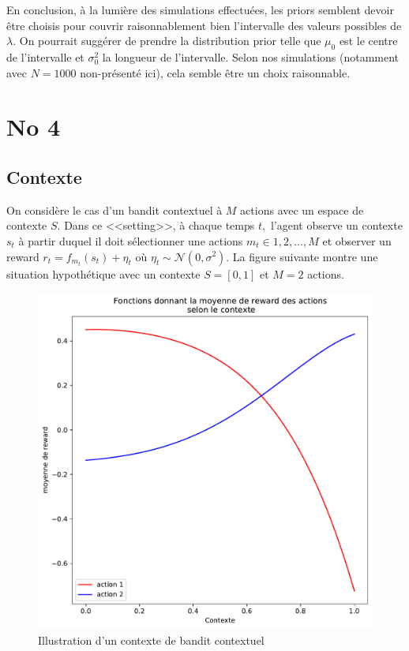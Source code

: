\documentclass[letterpaper,11pt]{article}
\begin{document}
En conclusion, à la lumière des simulations effectuées, les priors semblent devoir être choisis pour couvrir raisonnablement bien l'intervalle des valeurs possibles de $\lambda.$ On pourrait suggérer de prendre la distribution prior telle que $\mu_0$ est le centre de l'intervalle et $\sigma^2_0$ la longueur de l'intervalle. Selon nos simulations (notamment avec $N=1000$ non-présenté ici), cela semble être un choix raisonnable.

\section{No 4}

\subsection{Contexte}

On considère le cas d'un bandit contextuel à $M$ actions avec un espace de contexte $S.$ Dans ce <<setting>>, à chaque temps $t,$ l'agent observe un contexte $s_t$ à partir duquel il doit sélectionner une actions $m_t\in{1,2,\ldots,M}$ et observer un reward $r_t=f_{m_t}(s_t)+\eta_t$ où $\eta_t\sim\mathcal{N}(0,\sigma^2).$ La figure suivante montre une situation hypothétique avec un contexte $S=[0,1]$ et $M=2$ actions. 

\begin{figure}[H]
\caption{Illustration d'un contexte de bandit contextuel}\label{figure: contexte}
\begin{center}
\includegraphics[scale=0.5]{image_contexte_no4.pdf}
\end{center}
\end{figure}
\end{document}
